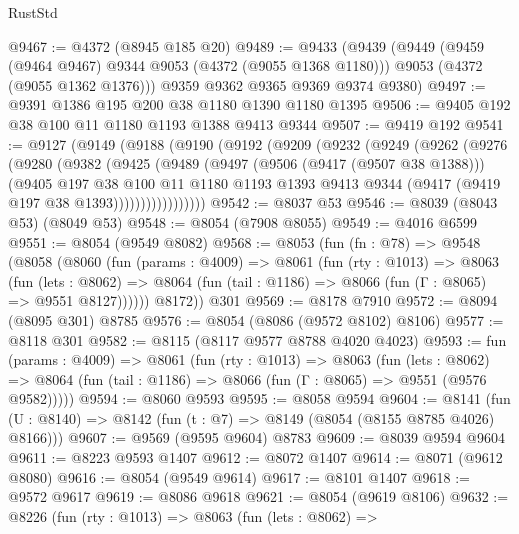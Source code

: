 \begin{lexlean}{RustStd}
\begin{coremodule}
@9467 := @4372 (@8945 @185 @20)
@9489 := @9433
    (@9439
      (@9449
        (@9459 (@9464 @9467) @9344 @9053 (@4372 (@9055 @1368 @1180)))
        @9053
        (@4372 (@9055 @1362 @1376)))
      @9359
      @9362
      @9365
      @9369
      @9374
      @9380)
@9497 := @9391 @1386 @195 @200 @38 @1180 @1390 @1180 @1395
@9506 := @9405 @192 @38 @100 @11 @1180 @1193 @1388 @9413 @9344
@9507 := @9419 @192
@9541 := @9127
    (@9149
      (@9188
        (@9190
          (@9192
            (@9209
              (@9232
                (@9249
                  (@9262
                    (@9276
                      (@9280
                        (@9382
                          (@9425
                            (@9489
                              (@9497
                                (@9506 (@9417 (@9507 @38 @1388)))
                                (@9405
                                  @197
                                  @38
                                  @100
                                  @11
                                  @1180
                                  @1193
                                  @1393
                                  @9413
                                  @9344
                                  (@9417 (@9419 @197 @38 @1393)))))))))))))))))
@9542 := @8037 @53
@9546 := @8039 (@8043 @53) (@8049 @53)
@9548 := @8054 (@7908 @8055)
@9549 := @4016 @6599
@9551 := @8054 (@9549 @8082)
@9568 := @8053
    (fun (fn : @78) =>
    @9548
      (@8058
        (@8060
          (fun (params : @4009) =>
          @8061
            (fun (rty : @1013) =>
            @8063
              (fun (lets : @8062) =>
              @8064 (fun (tail : @1186) => @8066 (fun (Γ : @8065) => @9551 @8127))))))
        @8172))
    @301
@9569 := @8178 @7910
@9572 := @8094 (@8095 @301) @8785
@9576 := @8054 (@8086 (@9572 @8102) @8106)
@9577 := @8118 @301
@9582 := @8115 (@8117 @9577 @8788 @4020 @4023)
@9593 := fun (params : @4009) =>
  @8061
    (fun (rty : @1013) =>
    @8063
      (fun (lets : @8062) =>
      @8064 (fun (tail : @1186) => @8066 (fun (Γ : @8065) => @9551 (@9576 @9582)))))
@9594 := @8060 @9593
@9595 := @8058 @9594
@9604 := @8141 (fun (U : @8140) => @8142 (fun (t : @7) => @8149 (@8054 (@8155 @8785 @4026) @8166)))
@9607 := @9569 (@9595 @9604) @8783
@9609 := @8039 @9594 @9604
@9611 := @8223 @9593 @1407
@9612 := @8072 @1407
@9614 := @8071 (@9612 @8080)
@9616 := @8054 (@9549 @9614)
@9617 := @8101 @1407
@9618 := @9572 @9617
@9619 := @8086 @9618
@9621 := @8054 (@9619 @8106)
@9632 := @8226
    (fun (rty : @1013) =>
    @8063
      (fun (lets : @8062) =>

\end{coremodule}
\end{lexlean}
